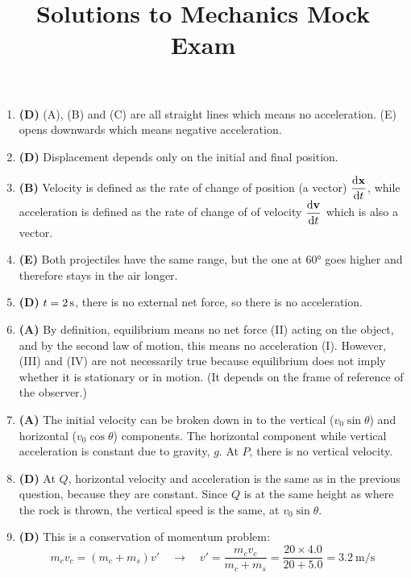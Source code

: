 \documentclass{../oss-handout}
\title{Solutions to Mechanics Mock Exam}
\begin{document}
\thispagestyle{title}
\gentitle

\begin{enumerate}[leftmargin=17pt]
\item\textbf{(D)} (A), (B) and (C) are all straight lines which means no
  acceleration. (E) opens downwards which means negative acceleration.

\item\textbf{(D)} Displacement depends only on the initial and final position.

\item\textbf{(B)} Velocity is defined as the rate of change of position (a
  vector) $\displaystyle\diff{\mathbf x}t$, while acceleration is defined as the rate of
  change of of velocity $\displaystyle\diff{\mathbf v}t$ which is also a vector.

\item\textbf{(E)} Both projectiles have the same range, but the one at \ang{60}
  goes higher and therefore stays in the air longer.

\item\textbf{(D)} $t=\SI2\second$, there is no external net force, so there
  is no acceleration.

\item\textbf{(A)} By definition, equilibrium means no net force (II) acting on
  the object, and by the second law of motion, this means no acceleration (I).
  However, (III) and (IV) are not necessarily true because equilibrium does not
  imply whether it is stationary or in motion. (It depends on the frame of
  reference of the observer.)

\item\textbf{(A)} The initial velocity can be broken down in to the
  vertical ($v_0\sin\theta$) and horizontal ($v_0\cos\theta$) components.
  The horizontal component while vertical acceleration is constant due to
  gravity, $g$. At $P$, there is no vertical velocity.

\item\textbf{(D)} At $Q$, horizontal velocity and acceleration is the same as
  in the previous question, because they are constant. Since $Q$ is at the same
  height as where the rock is thrown, the vertical speed is the same, at
  $v_0\sin\theta$.

\item\textbf{(D)} This is a conservation of momentum problem:
  \begin{equation*}
    m_cv_c=(m_c+m_s)v'\quad\longrightarrow\quad
    v'=\frac{m_cv_c}{m_c+m_s} = \frac{20\times 4.0}{20+5.0}
    =\SI{3.2}{\metre\per\second}
  \end{equation*}


\end{enumerate}
\end{document}
